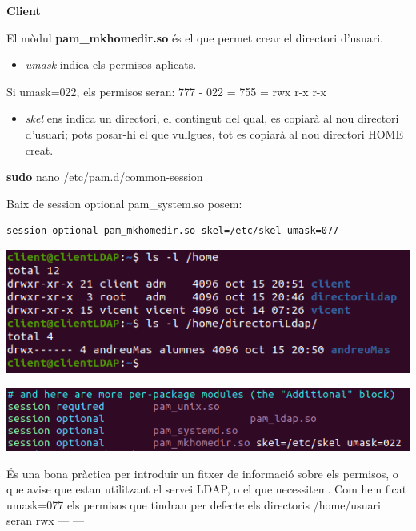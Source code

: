 \documentclass[
  12 pt,
  a4paper,
]{article}
\newenvironment{Shaded}{\begin{snugshade}}{\end{snugshade}}
\newcommand{\FunctionTok}[1]{\textcolor[rgb]{0.13,0.29,0.53}{\textbf{#1}}}
\newcommand{\NormalTok}[1]{#1}
\providecommand{\tightlist}{%
  \setlength{\itemsep}{0pt}\setlength{\parskip}{0pt}}
\begin{document}
\textbf{Client}

El mòdul \textbf{pam\_mkhomedir.so} és el que permet crear el directori
d'usuari.

\begin{itemize}
\tightlist
\item
  \emph{umask} indica els permisos aplicats.
\end{itemize}

Si umask=022, els permisos seran: 777 - 022 = 755 = rwx r-x r-x

\begin{itemize}
\tightlist
\item
  \emph{skel} ens indica un directori, el contingut del qual, es copiarà
  al nou directori d'usuari; pots posar-hi el que vullgues, tot es
  copiarà al nou directori HOME creat.
\end{itemize}

\begin{Shaded}
\begin{Highlighting}[]
\FunctionTok{sudo}\NormalTok{ nano /etc/pam.d/common{-}session}
\end{Highlighting}
\end{Shaded}

Baix de session optional pam\_system.so posem:

\begin{verbatim}
session optional pam_mkhomedir.so skel=/etc/skel umask=077
\end{verbatim}

\includegraphics{png/libpam9.png}

\includegraphics{png/libpam10.png}

És una bona pràctica per introduir un fitxer de informació sobre els
permisos, o que avise que estan utilitzant el servei LDAP, o el que
necessitem. Com hem ficat umask=077 els permisos que tindran per defecte
els directoris /home/usuari seran rwx --- ---
\end{document}
